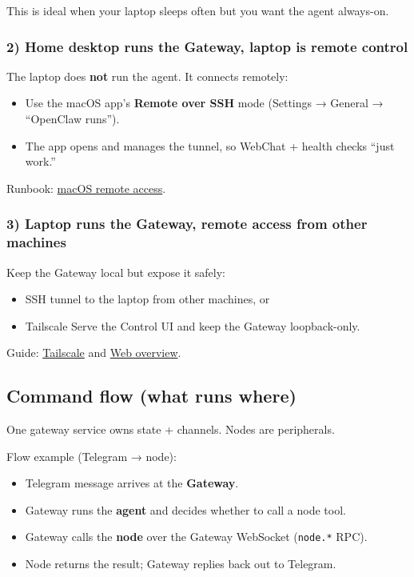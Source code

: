 This is ideal when your laptop sleeps often but you want the agent always-on.

\subsubsection{2) Home desktop runs the Gateway, laptop is remote control}


The laptop does \textbf{not} run the agent. It connects remotely:

\begin{itemize}
  \item Use the macOS app’s \textbf{Remote over SSH} mode (Settings → General → “OpenClaw runs”).
  \item The app opens and manages the tunnel, so WebChat + health checks “just work.”
\end{itemize}


Runbook: \href{/platforms/mac/remote}{macOS remote access}.

\subsubsection{3) Laptop runs the Gateway, remote access from other machines}


Keep the Gateway local but expose it safely:

\begin{itemize}
  \item SSH tunnel to the laptop from other machines, or
  \item Tailscale Serve the Control UI and keep the Gateway loopback-only.
\end{itemize}


Guide: \href{/gateway/tailscale}{Tailscale} and \href{/web}{Web overview}.

\subsection{Command flow (what runs where)}


One gateway service owns state + channels. Nodes are peripherals.

Flow example (Telegram → node):

\begin{itemize}
  \item Telegram message arrives at the \textbf{Gateway}.
  \item Gateway runs the \textbf{agent} and decides whether to call a node tool.
  \item Gateway calls the \textbf{node} over the Gateway WebSocket (\texttt{node.*} RPC).
  \item Node returns the result; Gateway replies back out to Telegram.
\end{itemize}


